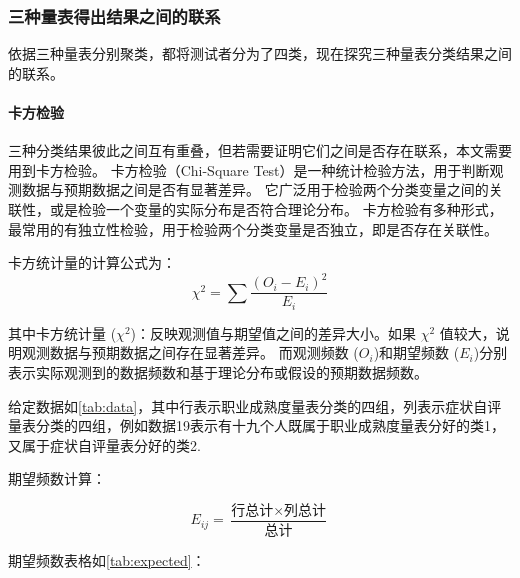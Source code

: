 \documentclass[withoutpreface,bwprint]{cumcmthesis} %
\begin{document}
\subsubsection{三种量表得出结果之间的联系}

依据三种量表分别聚类，都将测试者分为了四类，现在探究三种量表分类结果之间的联系。

\paragraph*{卡方检验}三种分类结果彼此之间互有重叠，但若需要证明它们之间是否存在联系，本文需要用到卡方检验。
卡方检验（Chi-Square Test）\cite{Chi-Square Test}是一种统计检验方法，用于判断观测数据与预期数据之间是否有显著差异。
它广泛用于检验两个分类变量之间的关联性，或是检验一个变量的实际分布是否符合理论分布。
卡方检验有多种形式，最常用的有独立性检验，用于检验两个分类变量是否独立，即是否存在关联性。


卡方统计量的计算公式为：
\begin{equation}
    \chi^2 = \sum \frac{(O_i - E_i)^2}{E_i}
    \label{eq:Chi-Square}
\end{equation}

其中卡方统计量 (\(\chi^2\))：反映观测值与期望值之间的差异大小。如果 \(\chi^2\) 值较大，说明观测数据与预期数据之间存在显著差异。
而观测频数 (\(O_i\))和期望频数 (\(E_i\))分别表示实际观测到的数据频数和基于理论分布或假设的预期数据频数。

给定数据如\cref{tab:data}，其中行表示职业成熟度量表分类的四组，列表示症状自评量表分类的四组，例如数据19表示有十九个人既属于职业成熟度量表分好的类1，又属于症状自评量表分好的类2.

期望频数计算：

\begin{equation}
    E_{ij} = \frac{\text{行总计} \times \text{列总计}}{\text{总计}}
    \label{eq:expected_frep}
\end{equation}

期望频数表格如\cref{tab:expected}：
\end{document}
